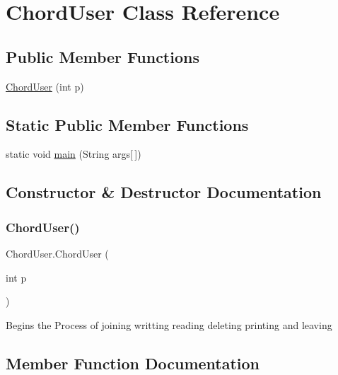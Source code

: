 \hypertarget{class_chord_user}{}\section{Chord\+User Class Reference}
\label{class_chord_user}
\subsection*{Public Member Functions}
\begin{DoxyCompactItemize}
\item 
\hyperlink{class_chord_user_ae885d3267350f3834158e42344854750}{Chord\+User} (int p)
\end{DoxyCompactItemize}
\subsection*{Static Public Member Functions}
\begin{DoxyCompactItemize}
\item 
static void \hyperlink{class_chord_user_a737455bbcfdae9ff4427063d77fb9038}{main} (String args\mbox{[}$\,$\mbox{]})
\end{DoxyCompactItemize}


\subsection{Constructor \& Destructor Documentation}
\hypertarget{class_chord_user_ae885d3267350f3834158e42344854750}{}\label{class_chord_user_ae885d3267350f3834158e42344854750} 
\subsubsection{\texorpdfstring{Chord\+User()}{ChordUser()}}
{\footnotesize\ttfamily Chord\+User.\+Chord\+User (\begin{DoxyParamCaption}\item[{int}]{p }\end{DoxyParamCaption})}

Begins the Process of joining writting reading deleting printing and leaving 

\subsection{Member Function Documentation}
\hypertarget{class_chord_user_a737455bbcfdae9ff4427063d77fb9038}{}\label{class_chord_user_a737455bbcfdae9ff4427063d77fb9038} 
